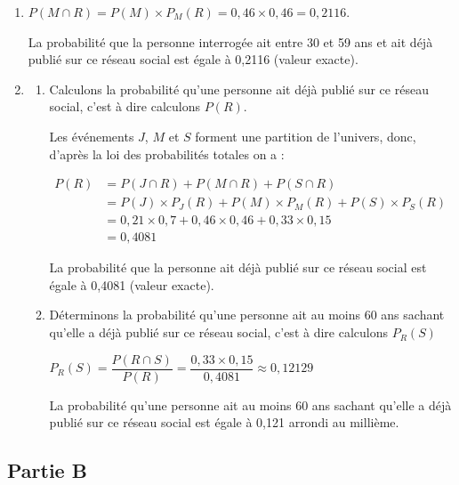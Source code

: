 \begin{enumerate}
	\item  $P(M \cap R)= P(M) \times P_M(R)= 0,46 \times 0,46 = 0,2116$.

	La probabilité que la personne interrogée ait entre 30 et 59 ans et ait déjà publié sur ce réseau social est égale à 0,2116 (valeur exacte).



	\item

	\begin{enumerate}
		\item Calculons la probabilité qu'une personne ait déjà publié sur ce réseau social, c'est à dire calculons $P(R)$.

		Les événements $J$, $M$ et $S$ forment une partition de l'univers, donc, d'après la loi des probabilités totales on a :

		$\begin{aligned}
			P(R) & = P(J \cap R) + P(M \cap R) + P(S \cap R) \\
			&= P(J) \times P_J(R) + P(M) \times P_M(R) + P(S) \times P_S(R) \\
			&= 0,21 \times 0,7 + 0,46 \times 0,46 + 0,33 \times 0,15 \\
			&= 0,4081
		\end{aligned}$

		La probabilité que la personne ait déjà publié sur ce réseau social est égale à 0,4081 (valeur exacte).

		\item Déterminons la probabilité qu'une personne ait au moins 60 ans sachant qu'elle a déjà publié sur ce réseau social, c'est à dire calculons $P_R(S)$

		$P_R(S)= \dfrac{P(R\cap S)}{P(R)}= \dfrac{0,33 \times 0,15}{0,4081} \approx 0,12129$

		La probabilité qu'une personne ait au moins 60 ans sachant qu'elle a déjà publié sur ce réseau social est égale à 0,121 arrondi au millième.
	\end{enumerate}
\end{enumerate}

\subsection*{Partie B}


